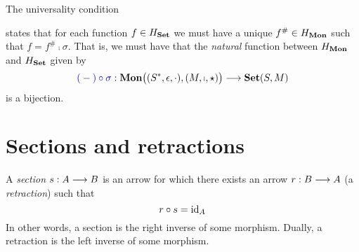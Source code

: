 \begin{remark}
    The universality condition
    \begin{center}
    \end{center}
    states that for each function $f \in H_{\mathbf {Set}}$
    we must have a unique $f^\# \in H_{\mathbf {Mon}}$ such that $f = f^\# \comp
    \sigma$.  That is, we must have that the \emph{natural} function
    between $H_{\mathbf {Mon}}$ and $H_{\mathbf {Set}}$ given by
    \begin{equation*}
      \textcolor{blue}{(}-\textcolor{blue}{)\circ\sigma}:
      \mathbf {Mon} \big( (S^*, \epsilon, \cdot), (M, \shortmid, \star) \big)
      \longrightarrow
      \mathbf {Set} ( S, M )
    \end{equation*}
    is a bijection.
\end{remark}

\section{Sections and retractions}

\begin{definition}
A \emph{section} $s : A \longrightarrow B$ is an arrow for which there exists an
arrow $r : B \longrightarrow A$ (a \emph{retraction}) such that
\[
    r \circ s = \mathrm{id}_{ A }
\]
In other words, a section is the right inverse of some morphism.
Dually, a retraction is the left inverse of some morphism.
\end{definition}

